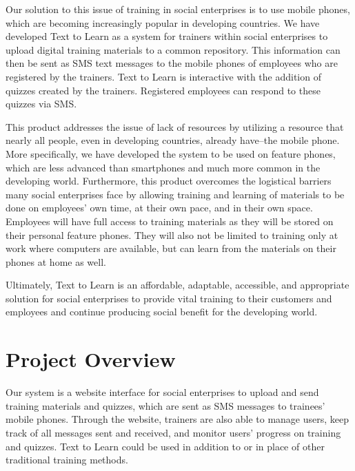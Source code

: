 Our solution to this issue of training in social enterprises is to use mobile phones, which are becoming increasingly popular in developing countries. We have developed Text to Learn as a system for trainers within social enterprises to upload digital training materials to a common repository. This information can then be sent as SMS text messages to the mobile phones of employees who are registered by the trainers. Text to Learn is interactive with the addition of quizzes created by the trainers. Registered employees can respond to these quizzes via SMS. 

This product addresses the issue of lack of resources by utilizing a resource that nearly all people, even in developing countries, already have--the mobile phone. More specifically, we have developed the system to be used on feature phones, which are less advanced than smartphones and much more common in the developing world. Furthermore, this product overcomes the logistical barriers many social enterprises face by allowing training and learning of materials to be done on employees’ own time, at their own pace, and in their own space. Employees will have full access to training materials as they will be stored on their personal feature phones. They will also not be limited to training only at work where computers are available, but can learn from the materials on their phones at home as well. 

Ultimately, Text to Learn is an affordable, adaptable, accessible, and appropriate solution for social enterprises to provide vital training to their customers and employees and continue producing social benefit for the developing world.


\section{Project Overview}
Our system is a website interface for social enterprises to upload and send training materials and quizzes, which are sent as SMS messages to trainees’ mobile phones. Through the website, trainers are also able to manage users, keep track of all messages sent and received, and monitor users' progress on training and quizzes. Text to Learn could be used in addition to or in place of other traditional training methods.

